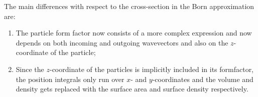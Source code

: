 The main differences with respect to the cross-section in the Born approximation are:
\begin{enumerate}
  \item The particle form factor now consists of a more complex expression and now depends on both incoming and outgoing wavevectors and also on the $z$-coordinate of the particle;
  \item Since the $z$-coordinate of the particles is implicitly included in its formfactor, the position integrals only run over $x$- and $y$-coordinates and the volume and density gets replaced with the surface area and surface density respectively.
\end{enumerate}


